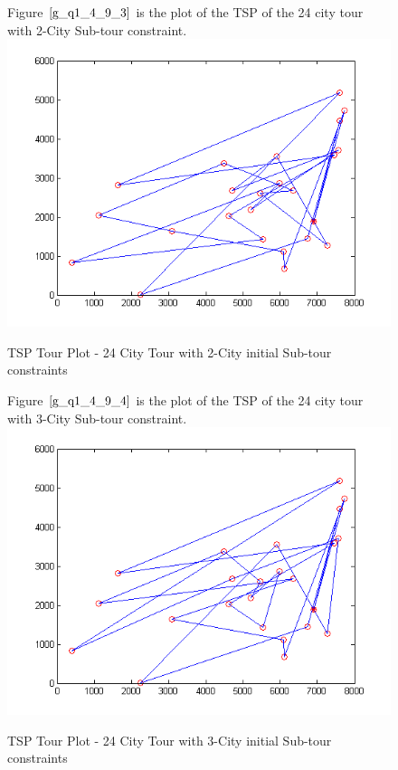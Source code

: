 \documentclass[twoside,12pt]{article}
\begin{document}
\begin{figure}[!htbp]
\centering
Figure $\eqref{g_q1_4_9_3}$ is the plot of the TSP of the 24 city tour with 2-City Sub-tour constraint. 
 \includegraphics[scale=1.3]{2_city/all_24_with_2} 
\caption{TSP Tour Plot - 24 City Tour with 2-City initial Sub-tour constraints}
\label{g_q1_4_9_3}
\end{figure}
\FloatBarrier


\begin{figure}[!htbp]
\centering
Figure $\eqref{g_q1_4_9_4}$ is the plot of the TSP of the 24 city tour with 3-City Sub-tour constraint. 
 \includegraphics[scale=1.2]{3_city/all_24_with_3} 
\caption{TSP Tour Plot - 24 City Tour with 3-City initial Sub-tour constraints}
\label{g_q1_4_9_4}
\end{figure}
\FloatBarrier
\end{document}
